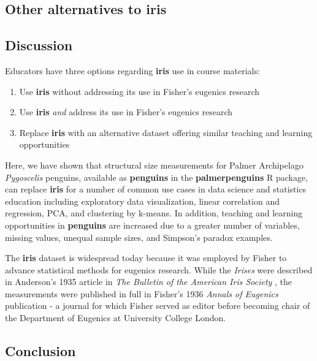 \hypertarget{other-alternatives-to-iris}{%
\subsection{Other alternatives to iris}\label{other-alternatives-to-iris}}

\hypertarget{discussion}{%
\subsection{Discussion}\label{discussion}}

Educators have three options regarding \textbf{iris} use in course materials:

\begin{enumerate}
\def\labelenumi{\arabic{enumi}.}
\tightlist
\item
  Use \textbf{iris} without addressing its use in Fisher's eugenics research
\item
  Use \textbf{iris} \emph{and} address its use in Fisher's eugenics research
\item
  Replace \textbf{iris} with an alternative dataset offering similar teaching and learning opportunities
\end{enumerate}

Here, we have shown that structural size measurements for Palmer Archipelago \emph{Pygoscelis} penguins, available as \textbf{penguins} in the \textbf{palmerpenguins} R package, can replace \textbf{iris} for a number of common use cases in data science and statistics education including exploratory data visualization, linear correlation and regression, PCA, and clustering by k-means. In addition, teaching and learning opportunities in \textbf{penguins} are increased due to a greater number of variables, missing values, unequal sample sizes, and Simpson's paradox examples.

The \textbf{iris} dataset is widespread today because it was employed by Fisher to advance statistical methods for eugenics research. While the \emph{Irises} were described in Anderson's 1935 article in \emph{The Bulletin of the American Iris Society} \citep{anderson_irises_1935}, the measurements were published in full in Fisher's 1936 \emph{Annals of Eugenics} publication \citep{fisher_use_1936} - a journal for which Fisher served as editor before becoming chair of the Department of Eugenics at University College London.

\hypertarget{conclusion}{%
\subsection{Conclusion}\label{conclusion}}

